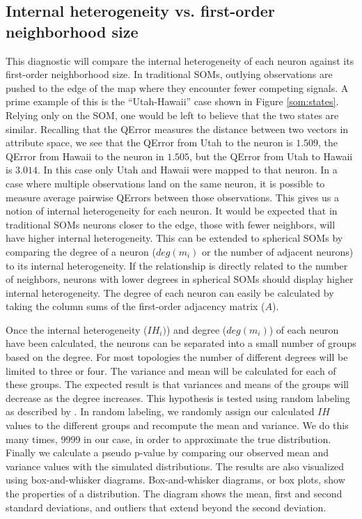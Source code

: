 \subsection{Internal heterogeneity vs. first-order neighborhood size}
\label{q1}
This diagnostic will compare the internal heterogeneity of each neuron against its
first-order neighborhood size.  In traditional SOMs, outlying observations are
pushed to the edge of the map where they encounter fewer competing signals. A
prime example of this is the ``Utah-Hawaii'' case shown in Figure
\ref{som:states}.  Relying only on the SOM, one would be left to believe that the
two states are similar.  Recalling that the QError measures the distance
between two vectors in attribute space, we see that the
QError from Utah to the neuron is $1.509$, the QError from Hawaii to
the neuron in $1.505$, but the QError from Utah to Hawaii is $3.014$. In this
case only Utah and Hawaii were mapped to that neuron.  In a case where
multiple observations land on the same neuron, it is possible to measure
average pairwise QErrors between those observations.  This gives us a notion
of internal heterogeneity for each neuron. It would be expected that in traditional
SOMs neurons closer to the edge, those with fewer neighbors, will have higher internal heterogeneity. This can
be extended to spherical SOMs by comparing the degree of a neuron ($deg(m_i)$
or the number of adjacent neurons) to its internal heterogeneity.  If the
relationship is directly related to the number of neighbors, neurons with lower
degrees in spherical SOMs should display higher internal heterogeneity.  The degree of
each neuron can easily be calculated by taking the column sums of the
first-order adjacency matrix ($A$).

Once the internal heterogeneity ($IH_i)$) and degree ($deg(m_i)$) of each neuron
have been calculated, the neurons can be separated into a small number of
groups based on the degree.  For most topologies the number of
different degrees will be limited to three or four.  The variance and mean
will be calculated for each of these groups.  The expected result is that
variances and means of the groups will decrease as the degree increases.  This
hypothesis is tested using random labeling as described by \cite{siss2004}.
In random labeling, we randomly assign our calculated $IH$ values to the
different groups and recompute the mean and variance.  We do this many times,
9999 in our case, in order to approximate the true distribution. Finally we
calculate a pseudo p-value by comparing our observed mean and variance values
with the simulated distributions.  The results are also visualized using
box-and-whisker diagrams. Box-and-whisker diagrams, or box plots, show the
properties of a distribution.  The diagram shows the mean, first and second
standard deviations, and outliers that extend beyond the second deviation.

